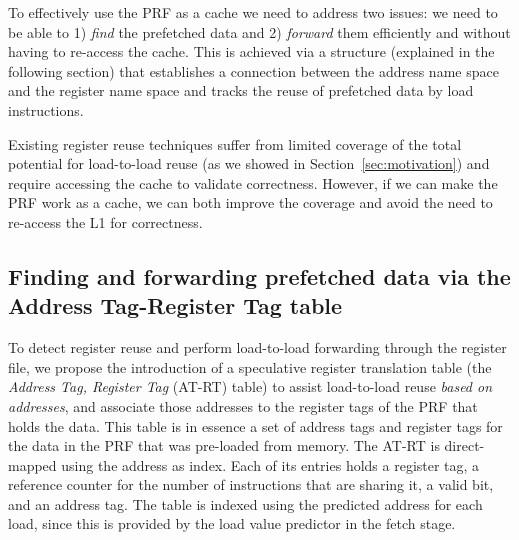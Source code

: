 \documentclass{sig-alternate}
\begin{document}
To effectively use the PRF as a cache we need to address two issues: we need to be able to 1) \emph{find} the prefetched data and 2) \emph{forward} them efficiently and without having to re-access the cache. 
This is achieved via a structure (explained in the following section) that establishes a connection between the address name space and the register name space and tracks the reuse of prefetched data by load instructions. 

Existing register reuse techniques suffer from limited coverage of the total potential for load-to-load reuse (as we showed in Section~\ref{sec:motivation}) and require accessing the cache to validate correctness. However, if we can make the PRF work as a cache, we can both improve the coverage and avoid the need to re-access the L1 for correctness. 



\subsection{Finding and forwarding prefetched data via the Address Tag-Register Tag table}
To detect register reuse and perform load-to-load forwarding through the register file, we propose the introduction of a speculative register translation table (the \textit{Address Tag, Register Tag} (AT-RT) table) to assist load-to-load reuse \textit{based on addresses}, and associate those addresses to the register tags of the PRF that holds the data. This table is in essence a set of address tags and register tags for the data in the PRF that was pre-loaded from memory. The AT-RT is direct-mapped using the address as index. Each of its entries holds a register tag, a reference counter for the number of instructions that are sharing it, a valid bit, and an address tag. The table is indexed using the predicted address for each load, since this is provided by the load value predictor in the fetch stage.
\end{document}
